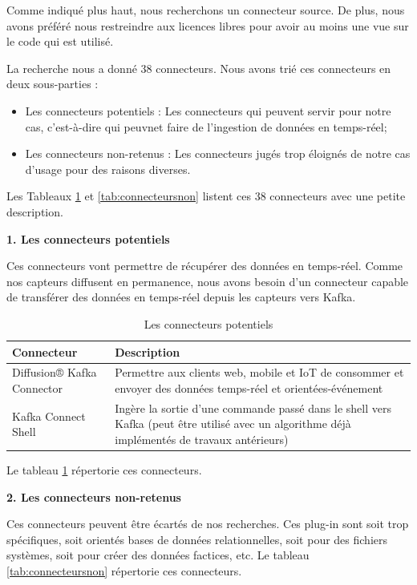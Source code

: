 \documentclass[11pt]{article}
\begin{document}
			Comme indiqué plus haut, nous recherchons un connecteur source.
			De plus, nous avons préféré nous restreindre aux licences libres pour avoir au moins une vue sur le code qui est utilisé.\par
			La recherche nous a donné 38 connecteurs.
			Nous avons trié ces connecteurs en deux sous-parties :
			\begin{itemize}
				\item Les connecteurs potentiels : Les connecteurs qui peuvent servir pour notre cas, c'est-à-dire qui peuvnet faire de l’ingestion de données en temps-réel;
				\item Les connecteurs non-retenus : Les connecteurs jugés trop éloignés de notre cas d’usage pour des raisons diverses.
			\end{itemize}
			Les Tableaux \ref{tab:potentiels} et \ref{tab:connecteursnon} listent ces 38 connecteurs avec une petite description.\par
			\textbf{1. Les connecteurs potentiels}\par
			Ces connecteurs vont permettre de récupérer des données en temps-réel. 
			Comme nos capteurs diffusent en permanence, nous avons besoin d’un connecteur capable de transférer des données en temps-réel depuis les capteurs vers Kafka.
			\begin{table}[h]
				\begin{tabular}{|p{7.5cm}|p{7.5cm}|}
					\hline
					\rowcolor{lightgray} Connecteur & Description\\\hline
					Diffusion® Kafka Connector & Permettre aux clients web, mobile et IoT de consommer et envoyer des données temps-réel et orientées-événement\\\hline
					Kafka Connect Shell & Ingère la sortie d’une commande passé dans le shell vers Kafka (peut être utilisé avec un algorithme déjà implémentés de travaux antérieurs) \\\hline
				\end{tabular}
				\caption{Les connecteurs potentiels}
				\label{tab:potentiels}
			\end{table}
			Le tableau \ref{tab:potentiels} répertorie ces connecteurs.\par
			\textbf{2. Les connecteurs non-retenus}\par
			Ces connecteurs peuvent être écartés de nos recherches. 
			Ces plug-in sont soit trop spécifiques, soit orientés bases de données relationnelles, soit pour des fichiers systèmes, soit pour créer des données factices, etc.
			Le tableau \ref{tab:connecteursnon} répertorie ces connecteurs.
\end{document}
